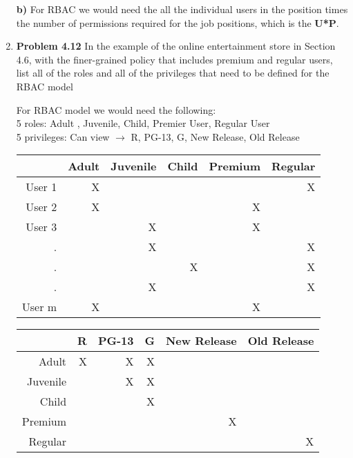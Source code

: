 \documentclass[12pt]{article}
\begin{document}
\begin{enumerate}
	\textbf{b)} For RBAC we would need the all the individual users in the position times the number of permissions required for the job positions, which is the \textbf{U*P}. 
	 
		
	\vspace{10pt}


	
	\item {\textbf{Problem 4.12} In the example of the online entertainment store in Section 4.6, with the finer-grained policy that includes premium and regular users, list all of the roles and all of the privileges that need to be defined for the RBAC model}
			
	For RBAC model we would need the following:\\
	5 roles: Adult , Juvenile,  Child, Premier User, Regular User\\
	5 privileges: Can view $\rightarrow$  R, PG-13, G, New Release, Old Release 
	\begin{center}
  \begin{tabular}{ | r | r | r | r | r | r |}
    \hline
      & Adult&Juvenile&Child&Premium&Regular\\ \hline
    
    User 1& X& & &  &X \\ \hline
    User 2& X& &  & X& \\ \hline
     User 3& & X & & X & \\ \hline
    . & &X &  & & X\\ \hline
    .& & &X  & & X\\ \hline
    . & & X&  & &X \\ \hline
    User m&X  & &&X  & \\ 
        \hline
  \end{tabular}
  
  \vspace{20pt}
  
   \begin{tabular}{ | r | r | r | r | r | r |}
    \hline
      & R&PG-13&G&New Release&Old Release\\ \hline
    
    Adult& X& X& X&  & \\ \hline
    Juvenile & & X&X  & & \\ \hline
     Child & &  & X&  & \\ \hline
    Premium & & &  &X & \\ \hline
    Regular& & &  & & X\\ 
        \hline
  \end{tabular}
\end{center}

				
		\vspace{10pt}
	

    
\end{enumerate}
\end{document}
